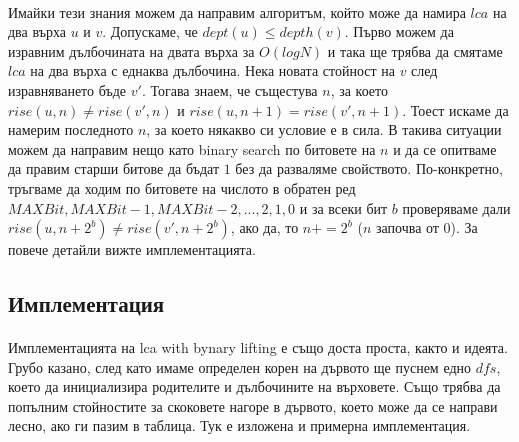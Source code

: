 \documentclass[12pt]{article}
\begin{document}
\paragraph*{}
Имайки тези знания можем да направим алгоритъм, който може да намира $lca$ на два върха $u$ и $v$. Допускаме, че $dept(u) \leq depth(v)$. Първо можем да изравним дълбочината на двата върха за $O(logN)$ и така ще трябва да смятаме $lca$ на два върха с еднаква дълбочина. Нека новата стойност на $v$ след изравняването бъде $v'$. Тогава знаем, че същестува $n$, за което $rise(u, n) \neq rise(v', n)$ и $rise(u, n+1) = rise(v', n+1)$. Тоест искаме да намерим последното $n$, за което някакво си условие е в сила. В такива ситуации можем да направим нещо като binary search по битовете на $n$ и да се опитваме да правим старши битове да бъдат $1$ без да разваляме свойството. По-конкретно, тръгваме да ходим по битовете на числото в обратен ред $MAXBit, MAXBit-1, MAXBit-2, ..., 2, 1, 0$ и за всеки бит $b$ проверяваме дали $rise(u, n+2^b) \neq rise(v', n+2^b)$, ако да, то $n += 2^b$ ($n$ започва от $0$). За повече детайли вижте имплементацията.  	

\subsection*{Имплементация}
\paragraph*{}
Имплементацията на lca with bynary lifting е също доста проста, както и идеята. Грубо казано, след като имаме определен корен на дървото ще пуснем едно $dfs$, което да инициализира родителите и дълбочините на върховете. Също трябва да попълним стойностите за скоковете нагоре в дървото, което може да се направи лесно, ако ги пазим в таблица. Тук е изложена и примерна имплементация.  
\end{document}
